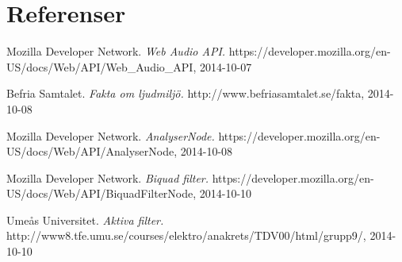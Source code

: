 \documentclass[12pt, titlepage, a4paper]{article}
\begin{document}
	\pagebreak

	\section{Referenser}
	\renewcommand{\addcontentsline}[3]{}%
  \renewcommand{\section}[2]{}%
  \begin{thebibliography}{99}

    Mozilla Developer Network.
    \emph{Web Audio API.}\newline
    https://developer.mozilla.org/en-US/docs/Web/API/Web\_Audio\_API, 2014-10-07

    Befria Samtalet.
    \emph{Fakta om ljudmiljö.}\newline
    http://www.befriasamtalet.se/fakta, 2014-10-08

    Mozilla Developer Network.
    \emph{AnalyserNode.}\newline
    https://developer.mozilla.org/en-US/docs/Web/API/AnalyserNode, 2014-10-08

  	Mozilla Developer Network.
    \emph{Biquad filter.}\newline
    https://developer.mozilla.org/en-US/docs/Web/API/BiquadFilterNode, 2014-10-10

    Umeås Universitet.
    \emph{Aktiva filter.}\newline
    http://www8.tfe.umu.se/courses/elektro/anakrets/TDV00/html/grupp9/, 2014-10-10

  \end{thebibliography}
\end{document}
